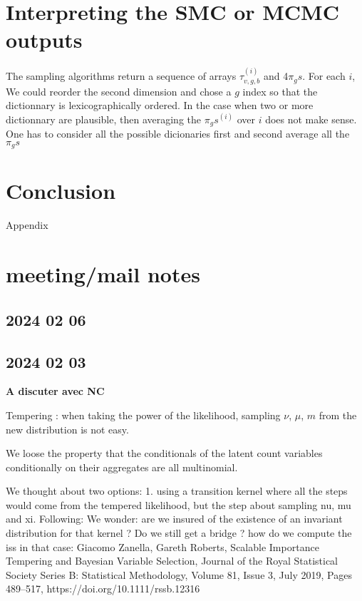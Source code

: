 \documentclass{article}
\newcommand\countdetail{m}
\begin{document}
\section{Interpreting the SMC or MCMC outputs}

The sampling algorithms return a sequence of arrays $\tau_{v,g,b}^{(i)}$ and 4$\pi_gs$.
For each $i$, We could reorder the second dimension and chose a $g$ index so that the dictionnary is lexicographically ordered. In the case when two or more  dictionnary are plausible, then averaging the $\pi_gs^{(i)}$ over $i$ does not make sense. One has to consider all the possible dicionaries first and second average all the $\pi_gs$



\section*{Conclusion}
%

\newpage
{\Huge Appendix}
\appendix



\section{meeting/mail notes}

\subsection{2024 02 06}



\subsection{2024 02 03}
{\bf A discuter avec NC}

Tempering : when taking the power of the likelihood, sampling $\nu$, $\mu$, $\countdetail$ from the new distribution is not easy.

We loose the property that the conditionals of the latent count variables conditionally on their aggregates are all multinomial.


We thought about two options: 
1. using a transition kernel where all the steps would come from the tempered likelihood, but the step about sampling nu, mu and xi.
Following:
We wonder: are we insured of the existence of an invariant distribution for that kernel ? Do we still get a bridge ? how do we compute the iss in that case:
Giacomo Zanella, Gareth Roberts, Scalable Importance Tempering and Bayesian Variable Selection, Journal of the Royal Statistical Society Series B: Statistical Methodology, Volume 81, Issue 3, July 2019, Pages 489–517, https://doi.org/10.1111/rssb.12316
\end{document}
